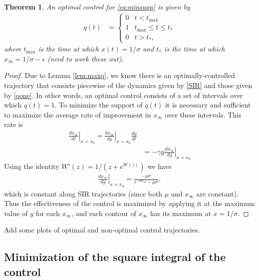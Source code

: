 \documentclass[english,12pt]{article}
\newtheorem{theorem}{Theorem}
\begin{document}
\begin{theorem}
An optimal control for \eqref{eq:minsupp} is given by
\begin{align}
    q(t) & = \begin{cases}  
        0 & t<t_{\max} \\
        1 & t_{\max}\le t \le t_* \\
        0 & t>t_*,
    \end{cases}
\end{align}
where $t_{\max}$ is the time at which $x(t)=1/\sigma$ and $t_*$ is the time
at which $x_\infty=1/\sigma-\epsilon$ (need to work these out).
\end{theorem}
\begin{proof}
    Due to Lemma \ref{lem:maxq}, we know there is an optimally-controlled
    trajectory that consists piecewise of the dynamics given by \eqref{SIR}
    and those given by \eqref{qone}.  In other words, an optimal control consists
    of a set of intervals over which $q(t)=1$.  To minimize the support of $q(t)$
    it is necessary and sufficient to maximize the average rate of improvement
    in $x_\infty$ over these intervals.  This rate is
    \begin{align*}
        \left. \frac{dx_\infty}{dt}\right|_{x=x_0} = \left. \frac{dx_\infty}{dy}\right|_{x=x_0} \frac{dy}{dt} \\
            & = -\gamma y \left. \frac{dx_\infty}{dy}\right|_{x=x_0}
    \end{align*}
    Using the identity $W'(z) = 1/(z+e^{W(z)})$ we have
    \begin{align*}
        \left. \frac{dx_\infty}{dy}\right|_{x=x_0} = \frac{-\mu \sigma}{e^{-\sigma x_\infty}-\mu\sigma},
    \end{align*}
    which is constant along SIR trajectories (since both $\mu$ and $x_\infty$ are constant).
    Thus the effectiveness of the control is maximized by applying it at the maximum
    value of $y$ for each $x_\infty$, and each contour of $x_\infty$ has its maximum
    at $x=1/\sigma$.
\end{proof}
Add some plots of optimal and non-optimal control trajectories.

\subsection{Minimization of the square integral of the control}



\end{document}
